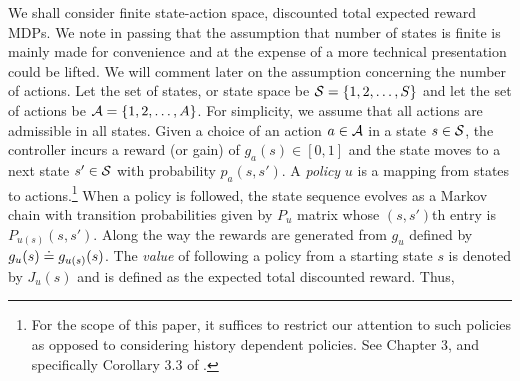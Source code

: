 \documentclass[twocolumn]{IEEEtran}
\begin{document}
We shall consider finite state-action space, discounted total expected reward MDPs.
We note in passing that the assumption that number of states is finite is mainly made for convenience and at the expense of a more technical presentation could be lifted. We will comment later on the assumption concerning the number of actions.
Let the set of states, or state space be $\S = \{1,2,\dots,S\}$ and let the set of actions be $\A = \{1,2,\dots,A\}$.
For simplicity, we assume that all actions are admissible in all states.
Given a choice of an action $a\in \A$ in a state $s\in \S$, the controller incurs a reward (or gain) of $g_a(s)\in [0,1]$
and the state moves to a next state $s'\in \S$ with probability $p_{a}(s,s')$.
A \emph{policy} $u$ is a mapping from states to actions.\footnote{For the scope of this paper, it suffices to restrict our attention to such policies as opposed to considering history dependent policies. See Chapter 3, and specifically Corollary 3.3 of \cite{Kall17}.}
When a policy is followed, the state sequence evolves as a Markov chain with transition probabilities given by $P_u$ matrix whose $(s,s')$th entry is $P_{u(s)}(s,s')$. Along the way the rewards are generated from $g_u$ defined by $g_u(s) \defeq g_{u(s)}(s)$.
The \emph{value} of following a policy from a starting state $s$ is denoted by $J_u(s)$ and is defined as
the expected total discounted reward. Thus,

\end{document}
